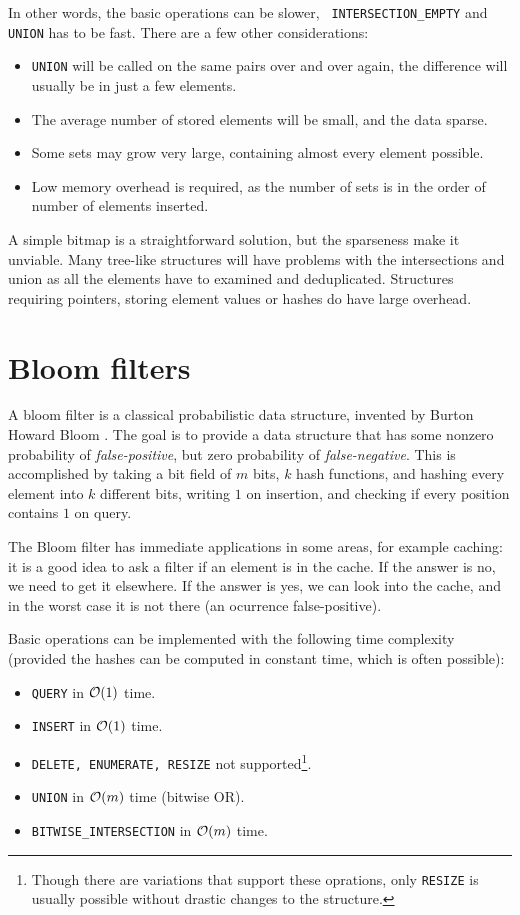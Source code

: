In other words, the basic operations can be slower, {\tt
INTERSECTION\_EMPTY} and {\tt UNION} has to be fast. There are a few other considerations:

\begin{itemize}
	\item {\tt UNION} will be called on the same pairs over and over again,
		the difference will usually be in just a few elements.
	\item The average number of stored elements will be small, and the data sparse.
	\item Some sets may grow very large, containing almost every element possible.
	\item Low memory overhead is required, as the number of sets is in the order
		of number of elements inserted.
\end{itemize}

A simple bitmap is a straightforward solution, but the sparseness make it
unviable. Many tree-like structures will have problems with the intersections
and union as all the elements have to examined and deduplicated. Structures
requiring pointers, storing element values or hashes do have large overhead.

\section{Bloom filters}

A bloom filter is a classical probabilistic data structure, invented by Burton
Howard Bloom \cite{Bloom1970}. The goal is to provide a data structure
that has some nonzero probability of {\it false-positive}, but zero probability
of {\it false-negative}. This is accomplished by taking a bit field of $m$ bits,
$k$ hash functions, and hashing every element into $k$ different bits, writing
$1$ on insertion, and checking if every position contains $1$ on query.

The Bloom filter has immediate applications in some areas, for example caching:
it is a good idea to ask a filter if an element is in the cache. If the answer is
no, we need to get it elsewhere. If the answer is yes, we can look into the
cache, and in the worst case it is not there (an ocurrence false-positive).

Basic operations can be implemented with the following time complexity (provided
the hashes can be computed in constant time, which is often possible):

\begin{itemize}
	\item {\tt QUERY} in $\mathcal{O}(1)$ time.
	\item {\tt INSERT} in $\mathcal{O}(1)$ time.
	\item {\tt DELETE, ENUMERATE, RESIZE} not supported\footnote{Though there
		are variations that support these oprations, only {\tt RESIZE} is usually
		possible without drastic changes to the structure.}.
	\item {\tt UNION} in $\mathcal{O}(m)$ time (bitwise OR).
	\item {\tt BITWISE\_INTERSECTION} in $\mathcal{O}(m)$ time.
\end{itemize}

